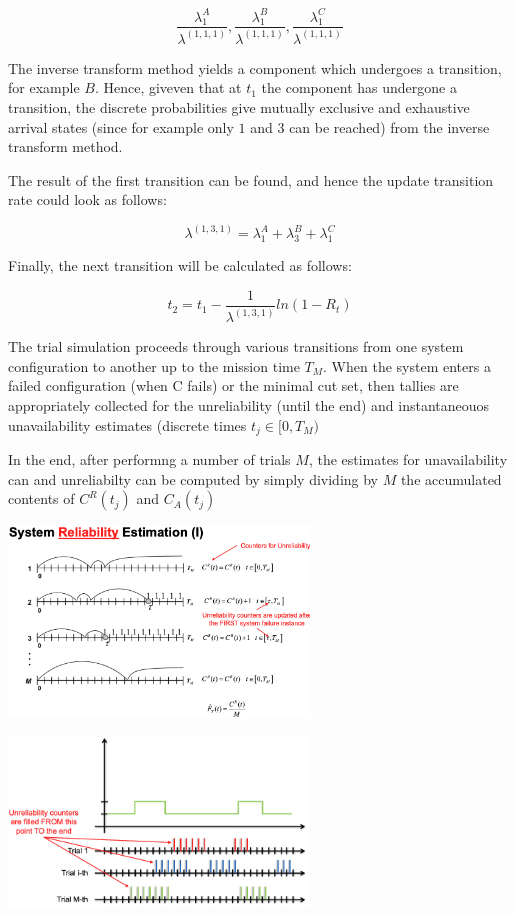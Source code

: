 \documentclass[8pt, landscape, fleqn]{scrartcl}
\begin{document}
\begin{multicols*}{3}
\begin{equation}
    \frac{\lambda_1^A}{\lambda^{(1,1,1)}}, \frac{\lambda_1^B}{\lambda^{(1,1,1)}}, \frac{\lambda_1^C}{\lambda^{(1,1,1)}}
\end{equation}

The inverse transform method yields a component which undergoes a transition, for example $B$. Hence, giveven that at $t_1$ the component has undergone a transition, the discrete probabilities give mutually exclusive and exhaustive arrival states (since for example only $1$ and $3$ can be reached) from the inverse transform method.

The result of the first transition can be found, and hence the update transition rate could look as follows:

\begin{equation}
    \lambda^{(1,3,1)} = \lambda_1^A + \lambda_3^B + \lambda_1^C
\end{equation}

Finally, the next transition will be calculated as follows:

\begin{equation}
    t_2 = t_1 - \frac{1}{\lambda^{(1,3,1)}} ln(1-R_t)
\end{equation}

The trial simulation proceeds through various transitions from one system configuration to another up to the mission time $T_M$. When the system enters a failed configuration (when C fails) or the minimal cut set, then tallies are appropriately collected for the unreliability (until the end) and instantaneouos unavailability estimates (discrete times $t_j \in [0,T_M)$

In the end, after performng a number of trials $M$, the estimates for unavailability can and unreliabilty can be computed by simply dividing by $M$ the accumulated contents of $C^R(t_j)$ and $C_A(t_j)$

\includegraphics[width=8cm]{Images/Reliability Estimation.png}

\includegraphics[width=8cm]{Images/Unavailability Estimation.png}


\end{multicols*}
\end{document}
